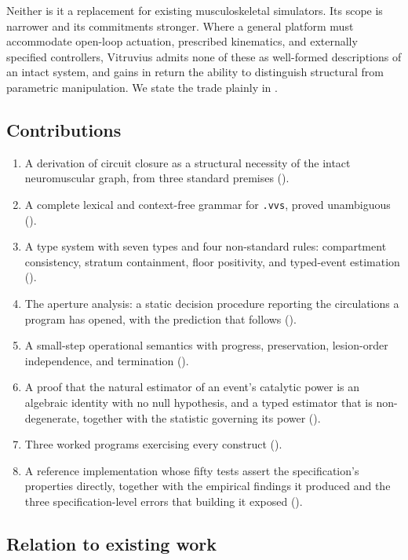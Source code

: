 \documentclass[11pt,twocolumn,a4paper]{article}
\theoremstyle{thmstyle}
\theoremstyle{definition}
\theoremstyle{remark}
\begin{document}
Neither is it a replacement for existing musculoskeletal simulators. Its scope
is narrower and its commitments stronger. Where a general platform must
accommodate open-loop actuation, prescribed kinematics, and externally
specified controllers, Vitruvius admits none of these as well-formed
descriptions of an intact system, and gains in return the ability to
distinguish structural from parametric manipulation. We state the trade
plainly in .

\subsection{Contributions}

\begin{enumerate}[leftmargin=1.6em,itemsep=1pt]
\item A derivation of circuit closure as a structural necessity of the intact
neuromuscular graph, from three standard premises ().
\item A complete lexical and context-free grammar for \texttt{.vvs}, proved
unambiguous ().
\item A type system with seven types and four non-standard rules: compartment
consistency, stratum containment, floor positivity, and typed-event
estimation ().
\item The aperture analysis: a static decision procedure reporting the
circulations a program has opened, with the prediction that follows
().
\item A small-step operational semantics with progress, preservation,
lesion-order independence, and termination ().
\item A proof that the natural estimator of an event's catalytic power is an
algebraic identity with no null hypothesis, and a typed estimator that is
non-degenerate, together with the statistic governing its power
().
\item Three worked programs exercising every construct
().
\item A reference implementation whose fifty tests assert the specification's
properties directly, together with the empirical findings it produced and the
three specification-level errors that building it exposed
().
\end{enumerate}

\subsection{Relation to existing work}
\end{document}

